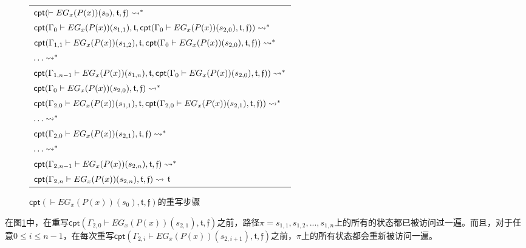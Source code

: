 \begin{example}
\begin{figure}[h!]
			\begin{tabular}{|l|}
				\hline
				$
				\textsf{cpt}(\vdash EG_x(P(x))(s_0),\mathfrak{t},\mathfrak{f}) \rightsquigarrow^*$\\
				$\textsf{cpt}(\Gamma_{0}\vdash EG_x(P(x))(s_{1,1}),\mathfrak{t},\textsf{cpt}(\Gamma_{0}\vdash EG_x(P(x))(s_{2,0}), \mathfrak{t},\mathfrak{f}))\rightsquigarrow^*
				$\\
				$\textsf{cpt}(\Gamma_{1,1}\vdash EG_x(P(x))(s_{1,2}),\mathfrak{t},\textsf{cpt}(\Gamma_{0}\vdash EG_x(P(x))(s_{2,0}), \mathfrak{t},\mathfrak{f}))\rightsquigarrow^*
				$\\
				$\ldots\rightsquigarrow^*$\\
				$\textsf{cpt}(\Gamma_{1,n-1}\vdash EG_x(P(x))(s_{1,n}),\mathfrak{t},\textsf{cpt}(\Gamma_{0}\vdash EG_x(P(x))(s_{2,0}), \mathfrak{t},\mathfrak{f}))\rightsquigarrow^*$\\
				$\textsf{cpt}(\Gamma_{0}\vdash EG_x(P(x))(s_{2,0}), \mathfrak{t},\mathfrak{f})\rightsquigarrow^*$\\
				$\textsf{cpt}(\Gamma_{2,0}\vdash EG_x(P(x))(s_{1,1}), \mathfrak{t},\textsf{cpt}(\Gamma_{2,0}\vdash EG_x(P(x))(s_{2,1}), \mathfrak{t},\mathfrak{f}))\rightsquigarrow^*$\\
				$\ldots\rightsquigarrow^*$\\
				$\textsf{cpt}(\Gamma_{2,0}\vdash EG_x(P(x))(s_{2,1}), \mathfrak{t},\mathfrak{f})\rightsquigarrow^*$\\
				$\ldots\rightsquigarrow^*$\\
				$\textsf{cpt}(\Gamma_{2,n-1}\vdash EG_x(P(x))(s_{2,n}), \mathfrak{t},\mathfrak{f})\rightsquigarrow^*$\\
				$\textsf{cpt}(\Gamma_{2,n}\vdash EG_x(P(x))(s_{2,n}), \mathfrak{t},\mathfrak{f})\rightsquigarrow$
				$\mathfrak{t}$\\
				\hline
			\end{tabular}
			\caption{$\textsf{cpt}(\vdash EG_x(P(x))(s_0),\mathfrak{t},\mathfrak{f})$的重写步骤}
			\label{example:globalmerge:fig}
		\end{figure}
		
		在图\ref{example:globalmerge:fig}中，在重写$\textsf{cpt}(\Gamma_{2,0}\vdash EG_x(P(x))(s_{2,1}), \mathfrak{t},\mathfrak{f})$之前，路径$\pi = s_{1,1},s_{1,2},...,s_{1,n}$上的所有的状态都已被访问过一遍。而且，对于任意$0\le i\le n-1$，在每次重写$\textsf{cpt}(\Gamma_{2,i}\vdash EG_x(P(x))(s_{2,i+1}), \mathfrak{t},\mathfrak{f})$之前，$\pi$上的所有状态都会重新被访问一遍。
		

\end{example}
